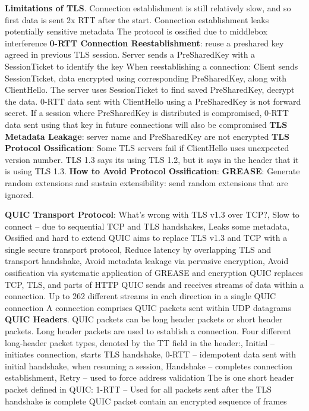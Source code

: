 \documentclass{article}
\begin{document}
\textbf{Limitations of TLS}.
Connection establishment is still relatively slow, and so first data is sent 2x RTT after the start.
Connection establishment leaks potentially sensitive metadata
The protocol is ossified due to middlebox interference
\textbf{0-RTT Connection Reestablishment}: reuse a preshared key agreed in previous TLS session.
Server sends a PreSharedKey with a SessionTicket to identify the key
When reestablishing a connection: Client sends SessionTicket, data encrypted using corresponding
PreSharedKey, along with ClientHello. The server uses SessionTicket to find saved PreSharedKey,
decrypt the data.
0-RTT data sent with ClientHello using a PreSharedKey is not forward secret.
If a session where PreSharedKey is distributed is compromised,
0-RTT data sent using that key in future connections will also be compromised
\textbf{TLS Metadata Leakage}: server name and PreSharedKey are not encrypted
\textbf{TLS Protocol Ossification}: Some TLS servers fail if ClientHello uses unexpected version number.
TLS 1.3 says its using TLS 1.2, but it says in the header that it is using TLS 1.3.
\textbf{How to Avoid Protocol Ossification}:
\textbf{GREASE}: Generate random extensions and sustain extensibility: send random extensions that are ignored.

\vspace{\baselineskip}
\textbf{QUIC Transport Protocol}:
What’s wrong with TLS v1.3 over TCP?,
Slow to connect – due to sequential TCP and TLS handshakes,
Leaks some metadata,
Ossified and hard to extend
QUIC aims to replace TLS v1.3 and TCP with a single secure transport protocol,
Reduce latency by overlapping TLS and transport handshake,
Avoid metadata leakage via pervasive encryption,
Avoid ossification via systematic application of GREASE and encryption
QUIC replaces TCP, TLS, and parts of HTTP
QUIC sends and receives streams of data within a connection.
Up to 262 different streams in each direction in a single QUIC connection
A connection comprises QUIC packets sent within UDP datagrams
\textbf{QUIC Headers}. QUIC packets can be long header packets or short header packets.
Long header packets are used to establish a connection.
Four different long-header packet types, denoted
by the TT field in the header:,
Initial – initiates connection, starts TLS handshake,
0-RTT – idempotent data sent with initial handshake, when resuming a session,
Handshake – completes connection establishment,
Retry – used to force address validation
The is one short header packet defined in QUIC\@:
1-RTT – Used for all packets sent after the TLS handshake is complete
QUIC packet contain an encrypted sequence of frames
\end{document}
